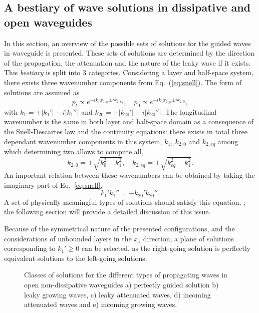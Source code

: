 \subsection{A bestiary of wave solutions in dissipative and open waveguides}
In this section, an overview of the possible sets of solutions for the guided waves in waveguide is presented. These sets of solutions are determined by the direction of the propagation, the attenuation and the nature of the leaky wave if it exists. This \emph{bestiary} is split into 3 categories. Considering a layer and half-space system, there exists three wavenumber components from Eq.~(\ref{eq:snell}). The form of solutions are assumed as 
\begin{equation}
   p_l \propto e^{-ik_1 x_1} e^{\pm ik_{2,eq}}, \quad p_0 \propto e^{-ik_1 x_1} e^{\pm ik_{2,0}}, 
\end{equation}
with $k_1 = +|k_1'| - i|k_1''|$ and $k_{20} = \pm |k_{20}'| \pm i|k_{20}''|$. The longitudinal wavenumber is the same in both layer and half-space domain as a consequence of the Snell-Descartes law and the continuity equations: there exists in total three dependant wavenumber components in this system, $k_1$, $k_{2,0}$ and $k_{2,eq}$ among which determining two allows to compute all,
\begin{equation}
    k_{2,0} = \pm \sqrt{k_0^2 - k_1^2}, \quad k_{2,eq} = \pm \sqrt{k_{eq}^2 - k_1^2}. 
\end{equation}
An important relation between these wavenumbers can be obtained by taking the imaginary part of Eq.~\ref{eq:snell},
\begin{equation}
    k_1'k_1'' = -k_{20}' k_{20}''. 
\end{equation} 
A set of physically meaningful types of solutions should satisfy this equation, \cite{treyssede2014}; the following section will provide a detailed discussion of this issue.

Because of the symmetrical nature of the presented configurations, and the considerations of unbounded layers in the $x_1$ direction, a plane of solutions corresponding to $k_1' \geq 0$ can be selected, as the right-going solution is perflectly equivalent solutions to the left-going solutions.  
\begin{figure}[h]
    \centering
    
    \caption{Classes of solutions for the different types of propagating waves in open non-dissipative waveguides a) perfectly guided solution b) leaky growing waves, c) leaky attenuated waves, d) incoming attenuated waves and e) incoming growing waves.}
    \label{fig:chap1_classification}
\end{figure}

